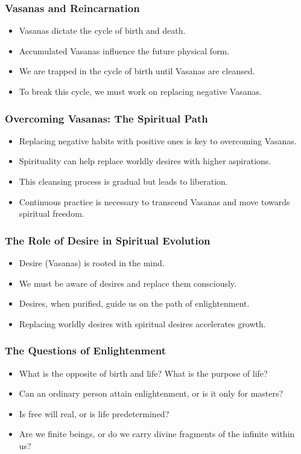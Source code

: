 \begin{frame}\frametitle{Vasanas and Reincarnation}
  \begin{itemize}
    \item Vasanas dictate the cycle of birth and death.
    \item Accumulated Vasanas influence the future physical form.
    \item We are trapped in the cycle of birth until Vasanas are cleansed.
    \item To break this cycle, we must work on replacing negative Vasanas.
  \end{itemize}
\end{frame}

\begin{frame}\frametitle{Overcoming Vasanas: The Spiritual Path}
  \begin{itemize}
    \item Replacing negative habits with positive ones is key to overcoming Vasanas.
    \item Spirituality can help replace worldly desires with higher aspirations.
    \item This cleansing process is gradual but leads to liberation.
    \item Continuous practice is necessary to transcend Vasanas and move towards spiritual freedom.
  \end{itemize}
\end{frame}

\begin{frame}\frametitle{The Role of Desire in Spiritual Evolution}
  \begin{itemize}
    \item Desire (Vasanas) is rooted in the mind.
    \item We must be aware of desires and replace them consciously.
    \item Desires, when purified, guide us on the path of enlightenment.
    \item Replacing worldly desires with spiritual desires accelerates growth.
  \end{itemize}
\end{frame}

\begin{frame}\frametitle{The Questions of Enlightenment}
  \begin{itemize}
    \item What is the opposite of birth and life? What is the purpose of life?
    \item Can an ordinary person attain enlightenment, or is it only for masters?
    \item Is free will real, or is life predetermined?
    \item Are we finite beings, or do we carry divine fragments of the infinite within us?
  \end{itemize}
\end{frame}

